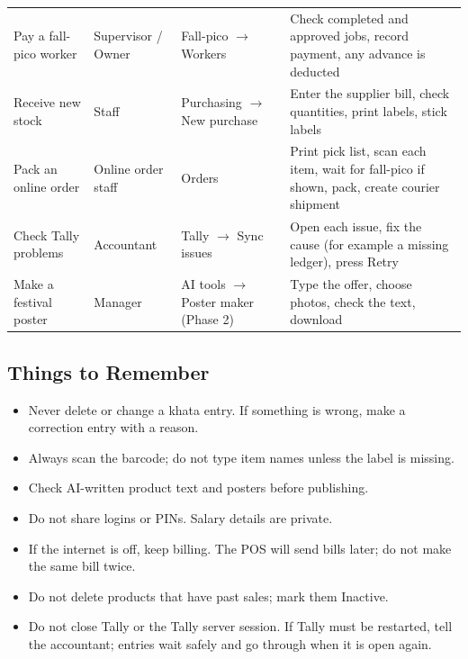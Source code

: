 \documentclass[11pt,a4paper]{article}
\begin{document}
{\begin{longtable}{L{2.8cm}L{1.8cm}L{3.2cm}L{8.7cm}}
Pay a fall-pico worker & Supervisor / Owner & Fall-pico $\rightarrow$ Workers & Check completed and approved jobs, record payment, any advance is deducted \\
Receive new stock & Staff & Purchasing $\rightarrow$ New purchase & Enter the supplier bill, check quantities, print labels, stick labels \\
Pack an online order & Online order staff & Orders & Print pick list, scan each item, wait for fall-pico if shown, pack, create courier shipment \\
Check Tally problems & Accountant & Tally $\rightarrow$ Sync issues & Open each issue, fix the cause (for example a missing ledger), press Retry \\
Make a festival poster & Manager & AI tools $\rightarrow$ Poster maker (Phase 2) & Type the offer, choose photos, check the text, download \\
\end{longtable}
}

\subsection{Things to Remember}
\begin{itemize}
\item Never delete or change a khata entry. If something is wrong, make a correction entry with a reason.
\item Always scan the barcode; do not type item names unless the label is missing.
\item Check AI-written product text and posters before publishing.
\item Do not share logins or PINs. Salary details are private.
\item If the internet is off, keep billing. The POS will send bills later; do not make the same bill twice.
\item Do not delete products that have past sales; mark them Inactive.
\item Do not close Tally or the Tally server session. If Tally must be restarted, tell the accountant; entries wait safely and go through when it is open again.
\end{itemize}
\end{document}
